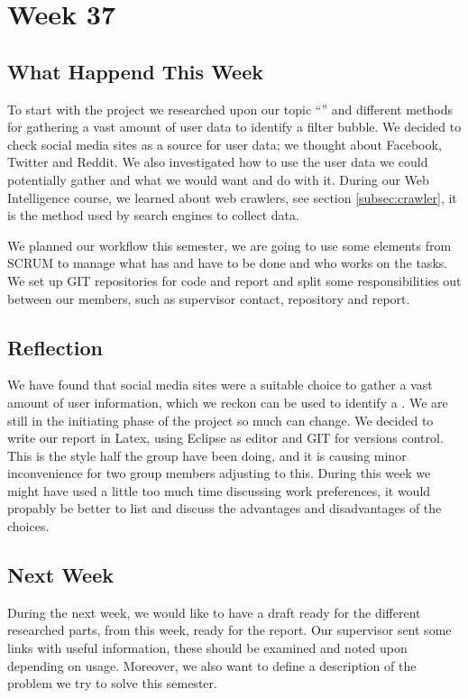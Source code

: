 \section*{Week 37}
\subsection*{What Happend This Week}
To start with the project we researched upon our topic ``\fb'' and different
methods for gathering a vast amount of user data to identify a filter bubble. We
decided to check social media sites as a source for user data; we thought about
Facebook, Twitter and Reddit. We also investigated how to use the user data we
could potentially gather and what we would want and do with it. During our Web
Intelligence course, we learned about web crawlers, see section
\ref{subsec:crawler}, it is the method used by search engines to collect data.

We planned our workflow this semester, we are going to use some elements from
SCRUM to manage what has and have to be done and who works on the tasks. We set
up GIT repositories for code and report and split some responsibilities out
between our members, such as supervisor contact, repository and report.

\subsection*{Reflection}
We have found that social media sites were a suitable choice to gather a vast
amount of user information, which we reckon can be used to identify a \fb. We
are still in the initiating phase of the project so much can change. We decided
to write our report in Latex, using Eclipse as editor and GIT for versions control.
This is the style half the group have been doing, and it is causing minor
inconvenience for two group members adjusting to this. During this week we might
have used a little too much time discussing work preferences, it would
propably be better to list and discuss the advantages and disadvantages of the
choices.

\subsection*{Next Week}
During the next week, we would like to have a draft ready for the different
researched parts, from this week, ready for the report. Our supervisor sent some
links with useful information, these should be examined and noted upon depending
on usage. Moreover, we also want to define a description of the problem we try
to solve this semester.

